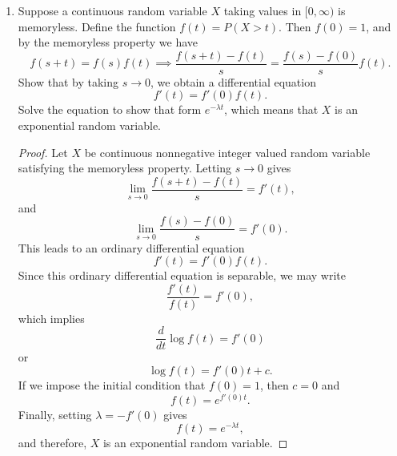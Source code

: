 \documentclass[oneside,reqno]{amsart}
\theoremstyle{definition}
\begin{document}
\begin{enumerate}
\item
Suppose a continuous random variable $X$ taking values in $[0, \infty)$ is memoryless. Define the function $f(t) = P(X > t)$. Then $f(0)=1$, and by the memoryless property we have 
\[
	f(s+t) = f(s)f(t) \implies \frac{f(s+t) - f(t)}{s} = \frac{f(s) - f(0)}{s} f(t).
\] 
Show that by taking $s \to 0$, we obtain a differential equation 
\[
	f'(t) = f'(0)f(t).
\]
Solve the equation to show that form $e^{-\lambda t}$, which means that $X$ is an exponential random variable. 
\begin{proof}
Let $X$ be continuous nonnegative integer valued random variable satisfying the memoryless property. Letting $s \to 0$ gives
\[
	\lim_{s \to 0} \frac{f(s + t) - f(t)}{s} = f'(t),
\]
and
\[
	\lim_{s \to 0} \frac{f(s) - f(0)}{s}  = f'(0).
\]
This leads to an ordinary differential equation 
\[
	f'(t) = f'(0) f(t). 
\]
Since this ordinary differential equation is separable, we may write 
\[
	\frac{f'(t)}{f(t)} = f'(0),
\]
which implies 
\[
	\frac{d}{dt}\log f(t) = f'(0) 
\]
or 
\[
	\log f(t) = f'(0)t + c. 
\]
If we impose the initial condition that $f(0)=1$, then $c=0$ and 
\[
	f(t) = e^{f'(0) t}.
\]
Finally, setting $\lambda = - f'(0)$ gives 
\[
	f(t) = e^{-\lambda t},
\]
and therefore, $X$ is an exponential random variable.
\end{proof}
\end{enumerate}
\end{document}

